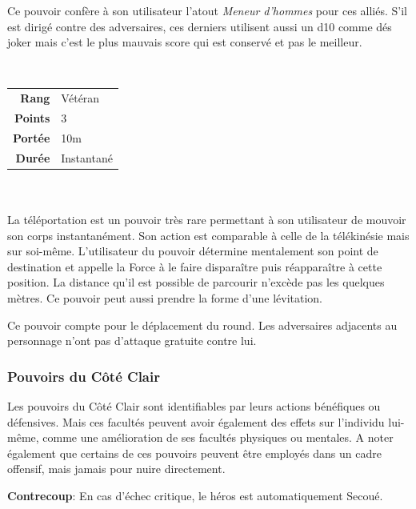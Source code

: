 \begin{description}[align=left]
        Ce pouvoir confère à son utilisateur l’atout \emph{Meneur d’hommes} pour ces alliés. S’il est dirigé contre des adversaires, ces derniers utilisent aussi un d10 comme dés joker mais c’est le plus mauvais score qui est conservé et pas le meilleur.
        \\

    \item [Téléportation] ~ \\

        \begin{tabular}{ r l }
            \textbf{Rang}    & Vétéran \\
            \textbf{Points}  & 3 \\
            \textbf{Portée}  & 10m \\
            \textbf{Durée}   & Instantané \\
        \end{tabular}
        \\ \\
        La téléportation est un pouvoir très rare permettant à son utilisateur de mouvoir son corps instantanément. Son action est comparable à celle de la télékinésie mais sur soi-même. L’utilisateur du pouvoir détermine mentalement son point de destination et appelle la Force à le faire disparaître puis réapparaître à cette position. La distance qu’il est possible de parcourir n’excède pas les quelques mètres. Ce pouvoir peut aussi prendre la forme d’une lévitation.

        Ce pouvoir compte pour le déplacement du round. Les adversaires adjacents au personnage n’ont pas d’attaque gratuite contre lui.
        \\

\end{description}

\subsubsection{Pouvoirs du Côté Clair}

Les pouvoirs du Côté Clair sont identifiables par leurs actions bénéfiques ou défensives. Mais ces facultés peuvent avoir également des effets sur l’individu lui-même, comme une amélioration de ses facultés physiques ou mentales. A noter également que certains de ces pouvoirs peuvent être employés dans un cadre offensif, mais jamais pour nuire directement. 

\textbf{Contrecoup}: En cas d’échec critique, le héros est automatiquement Secoué.

